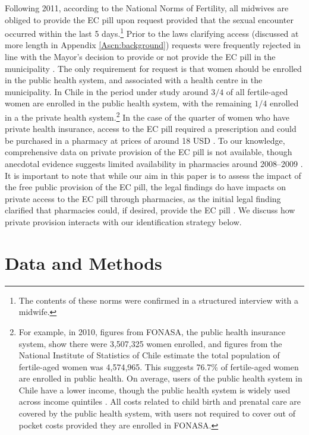 \documentclass[12pt]{article}
\begin{document}
\begin{spacing}{1.9}
Following 2011, according to the National Norms of Fertility, all midwives are obliged to provide the EC pill upon request provided that the sexual encounter occurred within the last 5 days.\footnote{The contents of these norms were confirmed in a structured interview with a midwife.}  Prior to the laws clarifying access (discussed at more length in Appendix \ref{Ascn:background}) requests were frequently rejected in line with the Mayor's decision to provide or not provide the EC pill in the municipality \citep{CasasBecerra2008}.  The only requirement for request is that women should be enrolled in the public health system, and associated with a health centre in the municipality.  In Chile in the period under study around $3/4$ of all fertile-aged women are enrolled in the public health system, with the remaining $1/4$ enrolled in a the private health system.\footnote{For example, in 2010, figures from FONASA, the public health insurance system, show there were 3,507,325 women enrolled, and figures from the National Institute of Statistics of Chile estimate the total population of fertile-aged women was 4,574,965.  This suggests 76.7\% of fertile-aged women are enrolled in public health.  On average, users of the public health system in Chile have a lower income, though the public health system is widely used across income quintiles \citep{Frenzetal2013}.  All costs related to child birth and prenatal care are covered by the public health system, with users not required to cover out of pocket costs provided they are enrolled in FONASA.}  In the case of the quarter of women who have private health insurance, access to the EC pill required a prescription and could be purchased in a pharmacy at prices of around 18 USD \citep{CasasBecerra2008}.  To our knowledge, comprehensive data on private provision of the EC pill is not available, though anecdotal evidence suggests limited availability in pharmacies around 2008--2009 \citep[p.\ 45]{Congress2010}.  It is important to note that while our aim in this paper is to assess the impact of the free public provision of the EC pill, the legal findings do have impacts on private access to the EC pill through pharmacies, as the initial legal finding clarified that pharmacies could, if desired, provide the EC pill \citep[p.\ 5]{NuevoChiqueroPino2019}. We discuss how private provision interacts with our identification strategy below.

\section{Data and Methods}

\end{spacing}
\end{document}
